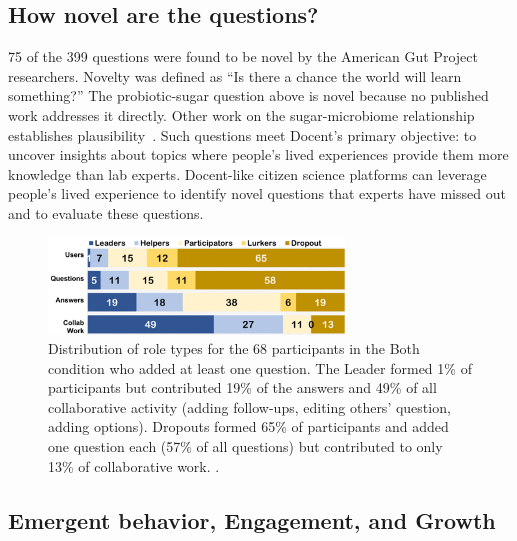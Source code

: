 \subsection{How novel are the questions?}
75 of the 399 questions were found to be novel by the American Gut Project researchers. Novelty was defined as “Is there a chance the world will learn something?” The probiotic-sugar question above is novel because no published work addresses it directly. Other work on the sugar-microbiome relationship establishes plausibility~\cite{Haukioja2008}. Such questions meet Docent’s primary objective: to uncover insights about topics where people’s lived experiences provide them more knowledge than lab experts. Docent-like citizen science platforms can leverage people’s lived experience to identify novel questions that experts have missed out and to evaluate these questions.

\begin{figure}[h] 
  \centering
  \includegraphics[width=0.7\textwidth]{figures/docent/fig-6.png}
  \caption[Distribution of role types]
{Distribution of role types for the 68 participants in the Both condition who added at least one question. The Leader formed 1\% of participants but contributed 19\% of the answers and 49\% of all collaborative activity (adding follow-ups, editing others’ question, adding options). Dropouts formed 65\% of participants and added one question each (57\% of all questions) but contributed to only 13\% of collaborative work. .}
  \label{fig:docent-6}
\end{figure}

\subsection{Emergent behavior, Engagement, and Growth}

